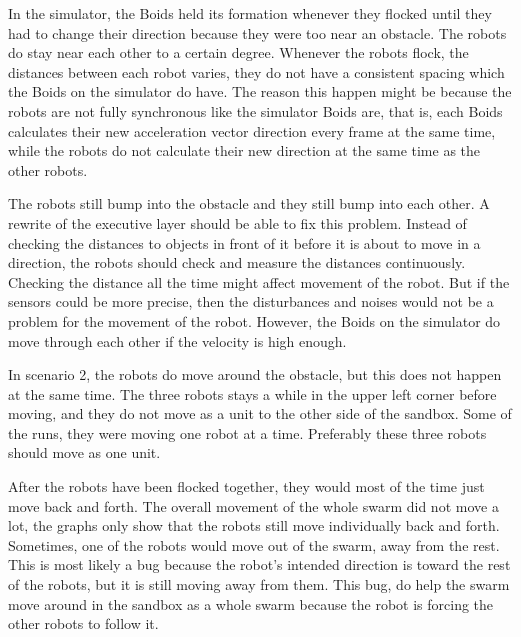 In the simulator, the Boids held its formation whenever they flocked until they had to change their direction because they were too near an obstacle. The robots do stay near each other to a certain degree. Whenever the robots flock, the distances between each robot varies, they do not have a consistent spacing which the Boids on the simulator do have. The reason this happen might be because the robots are not fully synchronous like the simulator Boids are, that is, each Boids calculates their new acceleration vector direction every frame at the same time, while the robots do not calculate their new direction at the same time as the other robots. 

The robots still bump into the obstacle and they still bump into each other. A rewrite of the executive layer should be able to fix this problem. Instead of checking the distances to objects in front of it before it is about to move in a direction, the robots should check and measure the distances continuously. Checking the distance all the time might affect movement of the robot. But if the sensors could be more precise, then the disturbances and noises would not be a problem for the movement of the robot.
However, the Boids on the simulator do move through each other if the velocity is high enough.

In scenario 2, the robots do move around the obstacle, but this does not happen at the same time. The three robots stays a while in the upper left corner before moving, and they do not move as a unit to the other side of the sandbox. Some of the runs, they were moving one robot at a time. Preferably these three robots should move as one unit.

After the robots have been flocked together, they would most of the time just move back and forth. The overall movement of the whole swarm did not move a lot, the graphs only show that the robots still move individually back and forth. Sometimes, one of the robots would move out of the swarm, away from the rest. This is most likely a bug because the robot's intended direction is toward the rest of the robots, but it is still moving away from them. This bug, do help the swarm move around in the sandbox as a whole swarm because the robot is forcing the other robots to follow it. 




